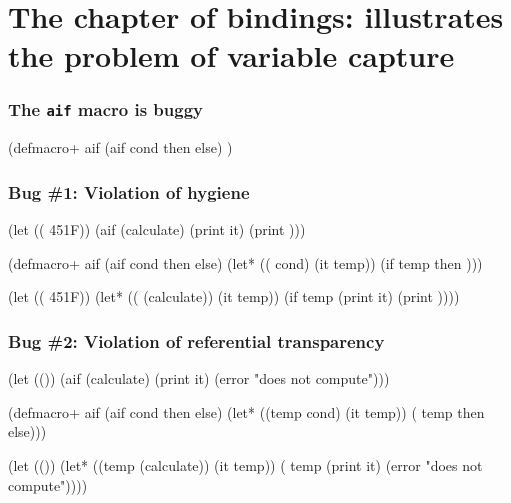 \documentclass[svgnames,hyperref={bookmarks=false}]{beamer}
\begin{document}
\section{The chapter of bindings: illustrates the problem of variable capture}

\begin{frame}[fragile]
\frametitle{The \texttt{aif} macro is buggy}
\begin{semiverbatim}
\text{\color{blue}{(aif (calculate)}}
  \text{\color{blue}{(print it)}}
  \text{\color{blue}{(error "does not compute"))}}

(defmacro+ aif
  (aif cond then else)
  \text{\color{red}{(let* ((temp cond)}}
         \text{\color{red}{(it temp))}}
    \text{\color{red}{(if temp then else))}})

\end{semiverbatim}
\end{frame}

\begin{frame}[fragile]
\frametitle{Bug \#1: Violation of hygiene}
\begin{semiverbatim}
(let ((\text{\color{blue}{temp}} 451{\textdegree}F))
  (aif (calculate)
    (print it)
    (print \text{\color{blue}{temp}})))

(defmacro+ aif
  (aif cond then else)
  (let* ((\text{\color{red}{temp}} cond)
         (it temp))
    (if temp then \text{\color{red}{else}})))

(let ((\text{\color{blue}{temp}} 451{\textdegree}F))
  (let* ((\text{\color{red}{temp}} (calculate))
         (it temp))
    (if temp
      (print it)
      (print \text{\color{red}{temp}}))))
\end{semiverbatim}
\end{frame}

\begin{frame}[fragile]
\frametitle{Bug \#2: Violation of referential transparency}
\begin{semiverbatim}
(let ((\text{\color{blue}{if hijacked}}))
  (aif (calculate)
    (print it)
    (error "does not compute")))

(defmacro+ aif
  (aif cond then else)
  (let* ((temp cond)
         (it temp))
    (\text{\color{red}{if}} temp then else))) \text{\color{red}{;; core if}}

(let ((\text{\color{blue}{if hijacked}}))
  (let* ((temp (calculate))
         (it temp))
    (\text{\color{blue}{if}} temp \text{\color{blue}{;; hijacked if}}
      (print it)
      (error "does not compute"))))
\end{semiverbatim}
\end{frame}
\end{document}
